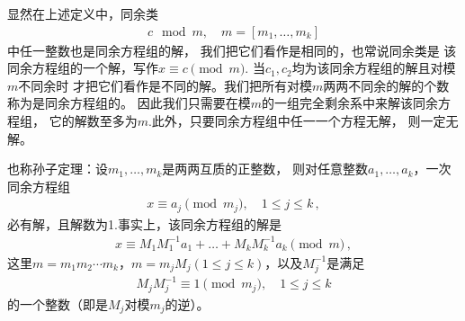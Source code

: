 显然在上述定义中，同余类
\begin{align}\label{eq:7.ex02.groupsolution}
    c\mod{m},\quad m=[m_1,\ldots,m_k]
\end{align}
中任一整数也是同余方程组的解，
我们把它们看作是相同的，也常说同余类是
该同余方程组的一个解，写作$x\equiv c\pmod{m}$.
当$c_1,c_2$均为该同余方程组的解且对模$m$不同余时
才把它们看作是不同的解。我们把所有对模$m$两两不同余的解的个数
称为是同余方程组的。
因此我们只需要在模$m$的一组完全剩余系中来解该同余方程组，
它的解数至多为$m$.此外，只要同余方程组中任一一个方程无解，
则一定无解。
\begin{theorem}\label{theorem:7.ex02.30}
    也称{\sffamily 孙子定理}：设$m_1,\ldots,m_k$是两两互质的正整数，
    则对任意整数$a_1,\ldots,a_k$，一次同余方程组
    \begin{align}\label{eq:7.ex02.CRT}
        x\equiv a_j\pmod{m_j},\quad 1\le j\le k\, ,
    \end{align}
    必有解，且解数为1.事实上，该同余方程组的解是
    \begin{align}
        x\equiv M_1M_1^{-1}a_1+\ldots+M_kM_k^{-1}a_k\pmod{m}\, ,
    \end{align}
    这里$m=m_1m_2\cdots m_k$，$m=m_jM_j(1\le j\le k)$，以及$M_j^{-1}$是满足
    \begin{align}
        M_jM_j^{-1}\equiv1\pmod{m_j},\quad 1\le j\le k
    \end{align}
    的一个整数（即是$M_j$对模$m_j$的逆）。
\end{theorem}
